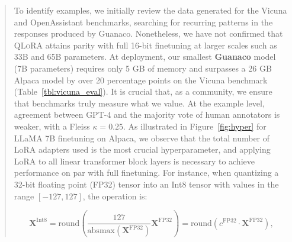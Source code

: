 \begin{quote}
To identify examples, we initially review the data generated for the Vicuna and OpenAssistant benchmarks, searching for recurring patterns in the responses produced by {Guanaco}. Nonetheless, we have not confirmed that \textsc{QLoRA} attains parity with full 16-bit finetuning at larger scales such as 33B and 65B parameters. At deployment, our smallest \textbf{Guanaco} model (7B parameters) requires only 5 GB of memory and surpasses a 26 GB Alpaca model by over 20 percentage points on the Vicuna benchmark (Table~\ref{tbl:vicuna_eval}). It is crucial that, as a community, we ensure that benchmarks truly measure what we value. At the example level, agreement between GPT-4 and the majority vote of human annotators is weaker, with a Fleiss $\kappa=0.25$. As illustrated in Figure~\ref{fig:hyper} for LLaMA 7B finetuning on Alpaca, we observe that the total number of LoRA adapters used is the most crucial hyperparameter, and applying LoRA to all linear transformer block layers is necessary to achieve performance on par with full finetuning. For instance, when quantizing a 32-bit floating point (FP32) tensor into an Int8 tensor with values in the range $[-127, 127]$, the operation is:

\begin{equation}
    \mathbf{X}^{ \text{Int8}} = \text{round}\left( \frac{127}{{\text{absmax}}(\mathbf{X}^{{\text{FP32}}})}\mathbf{X}^{{\text{FP32}}} \right) = \text{round}(c^{\text{FP32}}\cdot \mathbf{X}^{{\text{FP32}}}),
\end{equation}


\end{quote}
